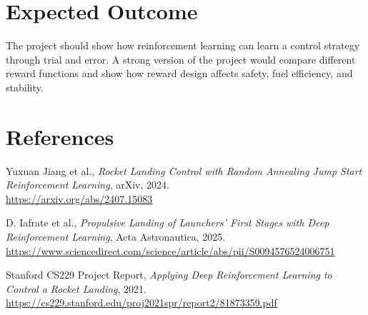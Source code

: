\documentclass[11pt,a4paper]{article}
\begin{document}
\section{Expected Outcome}

The project should show how reinforcement learning can learn a control strategy through trial and error. A strong version of the project would compare different reward functions and show how reward design affects safety, fuel efficiency, and stability.

\section*{References}

\begin{enumerate}[label={[\arabic*]},leftmargin=2.2em]
    \item Yuxuan Jiang et al., \textit{Rocket Landing Control with Random Annealing Jump Start Reinforcement Learning}, arXiv, 2024.\\
    \url{https://arxiv.org/abs/2407.15083}

    \item D. Iafrate et al., \textit{Propulsive Landing of Launchers' First Stages with Deep Reinforcement Learning}, Acta Astronautica, 2025.\\
    \url{https://www.sciencedirect.com/science/article/abs/pii/S0094576524006751}

    \item Stanford CS229 Project Report, \textit{Applying Deep Reinforcement Learning to Control a Rocket Landing}, 2021.\\
    \url{https://cs229.stanford.edu/proj2021spr/report2/81873359.pdf}
\end{enumerate}
\end{document}
